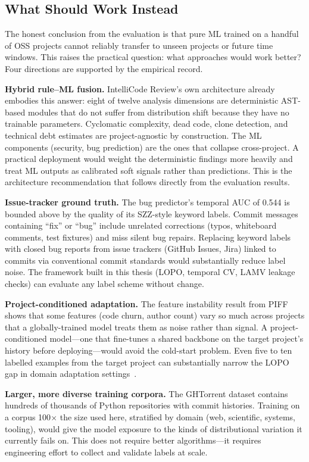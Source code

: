\documentclass[12pt, oneside]{report}
\begin{document}
\subsection{What Should Work Instead}
\label{ssec:what-works}

The honest conclusion from the evaluation is that pure ML trained on a handful of OSS
projects cannot reliably transfer to unseen projects or future time windows. This raises
the practical question: what approaches would work better? Four directions are supported
by the empirical record.

\textbf{Hybrid rule--ML fusion.} IntelliCode Review's own architecture already embodies
this answer: eight of twelve analysis dimensions are deterministic AST-based modules
that do not suffer from distribution shift because they have no trainable parameters.
Cyclomatic complexity, dead code, clone detection, and technical debt estimates are
project-agnostic by construction. The ML components (security, bug prediction) are the
ones that collapse cross-project. A practical deployment would weight the deterministic
findings more heavily and treat ML outputs as calibrated soft signals rather than
predictions. This is the architecture recommendation that follows directly from the
evaluation results.

\textbf{Issue-tracker ground truth.} The bug predictor's temporal AUC of 0.544 is
bounded above by the quality of its SZZ-style keyword labels. Commit messages containing
``fix'' or ``bug'' include unrelated corrections (typos, whiteboard comments, test
fixtures) and miss silent bug repairs. Replacing keyword labels with closed bug reports
from issue trackers (GitHub Issues, Jira) linked to commits via conventional commit
standards would substantially reduce label noise. The framework built in this thesis
(LOPO, temporal CV, LAMV leakage checks) can evaluate any label scheme without change.

\textbf{Project-conditioned adaptation.} The feature instability result from PIFF shows
that some features (code churn, author count) vary so much across projects that a
globally-trained model treats them as noise rather than signal. A project-conditioned
model---one that fine-tunes a shared backbone on the target project's history before
deploying---would avoid the cold-start problem. Even five to ten labelled examples
from the target project can substantially narrow the LOPO gap in domain adaptation
settings~\cite{pan2010}.

\textbf{Larger, more diverse training corpora.} The GHTorrent dataset contains hundreds
of thousands of Python repositories with commit histories. Training on a corpus 100$\times$
the size used here, stratified by domain (web, scientific, systems, tooling), would give
the model exposure to the kinds of distributional variation it currently fails on. This
does not require better algorithms---it requires engineering effort to collect and
validate labels at scale.
\end{document}
